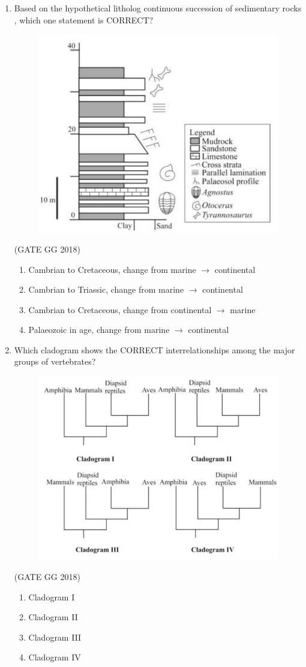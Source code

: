 \documentclass[journal]{IEEEtran}
\begin{document}
\begin{enumerate}[start=1]
\item Based on the hypothetical litholog continuous succession of sedimentary rocks , which one statement is CORRECT?  
\begin{figure}[H]
        \centering
        \includegraphics[width=0.5\columnwidth]{figs/05.png}
        \caption*{}
        \label{fig:q10}
    \end{figure}
    \hfill(GATE GG 2018)
\begin{enumerate}
\item Cambrian to Cretaceous, change from marine $\rightarrow$ continental
\item Cambrian to Triassic, change from marine $\rightarrow$ continental
\item Cambrian to Cretaceous, change from continental $\rightarrow$ marine
\item Palaeozoic in age, change from marine $\rightarrow$ continental
\end{enumerate}

\item Which cladogram shows the CORRECT interrelationships among the major groups of vertebrates? 
\begin{figure}[H]
        \centering
        \includegraphics[width=0.5\columnwidth]{figs/06.png}
        \caption*{}
        \label{fig:q10}
    \end{figure}
    \hfill(GATE GG 2018)
\begin{multicols}{4}
\begin{enumerate}
\item Cladogram I
\item Cladogram II
\item Cladogram III
\item Cladogram IV
\end{enumerate}
\end{multicols}


\end{enumerate}
\end{document}
